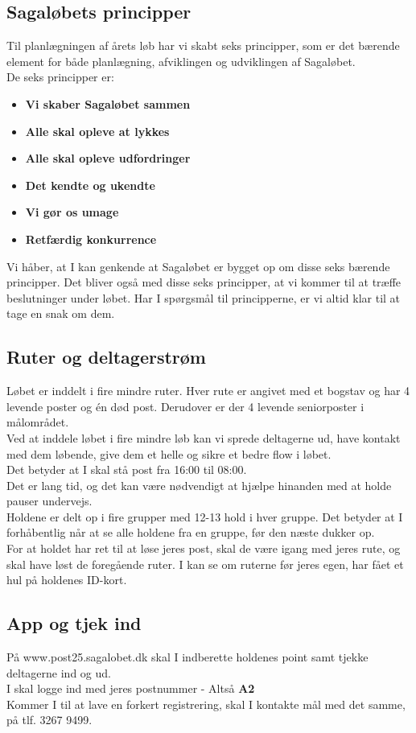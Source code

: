 \subsection{Sagaløbets principper}
Til planlægningen af årets løb har vi skabt seks principper, som er det bærende element for både planlægning, afviklingen og udviklingen af Sagaløbet.\\
De seks principper er:
\begin{itemize}
  \item \textbf{Vi skaber Sagaløbet sammen}
  \item \textbf{Alle skal opleve at lykkes}
  \item \textbf{Alle skal opleve udfordringer}
  \item \textbf{Det kendte og ukendte}
  \item \textbf{Vi gør os umage}
  \item \textbf{Retfærdig konkurrence}
\end{itemize}
Vi håber, at I kan genkende at Sagaløbet er bygget op om disse seks bærende principper. Det bliver også med disse seks principper, at vi kommer til at træffe beslutninger under løbet. Har I spørgsmål til principperne, er vi altid klar til at tage en snak om dem.
\subsection{Ruter og deltagerstrøm}
Løbet er inddelt i fire mindre ruter. Hver rute er angivet med et bogstav og har 4 levende poster og én død post. Derudover er der 4 levende seniorposter i målområdet.\\
Ved at inddele løbet i fire mindre løb kan vi sprede deltagerne ud, have kontakt med dem løbende, give dem et helle og sikre et bedre flow i løbet.\\
\newline
Det betyder at I skal stå post fra 16:00 til 08:00.\\
Det er lang tid, og det kan være nødvendigt at hjælpe hinanden med at holde pauser undervejs.\\
\newline
Holdene er delt op i fire grupper med 12-13 hold i hver gruppe. Det betyder at I forhåbentlig når at se alle holdene fra en gruppe, før den næste dukker op.\\
For at holdet har ret til at løse jeres post, skal de være igang med jeres rute, og skal have løst de foregående ruter. I kan se om ruterne før jeres egen, har fået et hul på holdenes ID-kort.
\subsection{App og tjek ind}
På www.post25.sagalobet.dk skal I indberette holdenes point samt tjekke deltagerne ind og ud.\\
I skal logge ind med jeres postnummer - Altså \textbf{A2}\\
\newline
Kommer I til at lave en forkert registrering, skal I kontakte mål med det samme, på tlf. 3267 9499.
\newpage
\vspace*{.4cm}
